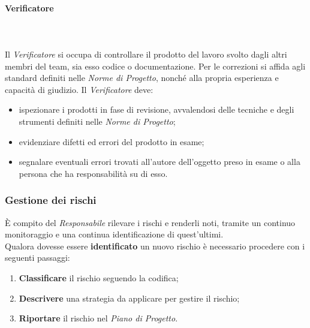 \paragraph{Verificatore}\mbox{} \\ \mbox{} \\
Il \textit{Verificatore} si occupa di controllare il prodotto del lavoro svolto dagli altri membri del team, sia esso codice o documentazione. Per le correzioni si affida agli standard definiti nelle \textit{Norme di Progetto}, nonché alla propria esperienza e capacità di giudizio.
Il \textit{Verificatore} deve:
\begin{itemize}
	\item ispezionare i prodotti in fase di revisione, avvalendosi delle tecniche e degli strumenti definiti nelle \textit{Norme di Progetto};
	\item evidenziare difetti ed errori del prodotto in esame;
	\item segnalare eventuali errori trovati all'autore dell'oggetto preso in esame o alla persona che ha responsabilità su di esso.
\end{itemize}

\subsubsection{Gestione dei rischi}
È compito del \textit{Responsabile} rilevare i rischi e renderli noti, tramite un continuo monitoraggio e una continua identificazione di quest'ultimi. \\
Qualora dovesse essere \textbf{identificato} un nuovo rischio è necessario procedere con i seguenti passaggi:
\begin{enumerate}
	\item \textbf{Classificare} il rischio seguendo la codifica;
	\item \textbf{Descrivere} una strategia da applicare per gestire il rischio;
	\item \textbf{Riportare} il rischio nel \textit{Piano di Progetto}.
\end{enumerate}

